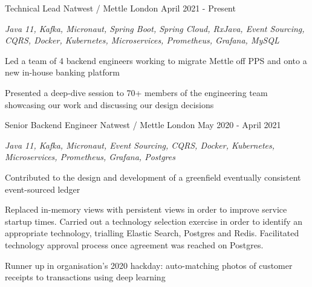 

\begin{cventries}


  \cventry
    {Technical Lead} %
    {Natwest / Mettle} %
    {London} %
    {April 2021 - Present} %
    {
      \begin{cvitems} %
        \item {\itshape{Java 11, Kafka, Micronaut, Spring Boot, Spring Cloud, RxJava, Event Sourcing, CQRS, Docker, Kubernetes, Microservices, Prometheus, Grafana, MySQL}}
        \item {Led a team of 4 backend engineers working to migrate Mettle off PPS and onto a new in-house banking platform}        
        \item {Presented a deep-dive session to 70+ members of the engineering team showcasing our work and discussing our design decisions}
      \end{cvitems}
    }

  \cventry
    {Senior Backend Engineer} %
    {Natwest / Mettle} %
    {London} %
    {May 2020 - April 2021} %
    {
      \begin{cvitems} %
        \item {\itshape{Java 11, Kafka, Micronaut, Event Sourcing, CQRS, Docker, Kubernetes, Microservices, Prometheus, Grafana, Postgres}}
        \item {Contributed to the design and development of a greenfield eventually consistent event-sourced ledger}
        \item {Replaced in-memory views with persistent views in order to improve service startup times. Carried out a technology selection exercise in order to identify an appropriate technology, trialling Elastic Search, Postgres and Redis. Facilitated technology approval process once agreement was reached on Postgres.}
        \item {Runner up in organisation's 2020 hackday: auto-matching photos of customer receipts to transactions using deep learning}
      \end{cvitems}
    }


\end{cventries}
